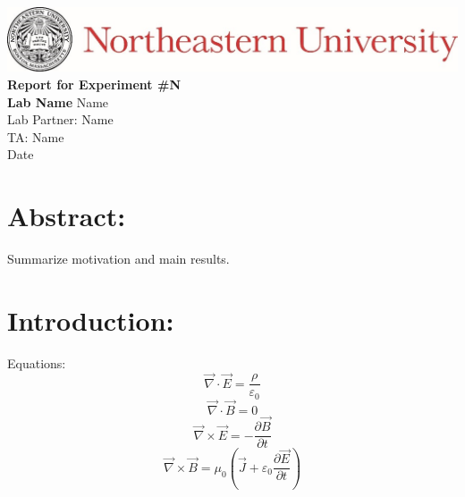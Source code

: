 \documentclass[12pt,a4paper]{article}
\begin{document}
	\begin{center}
		\includegraphics{Header}
		\vfill		
		\textbf{\Large{Report for Experiment \#N\\
		Lab Name}}
		\vfill
		Name\\
		Lab Partner: Name\\
		TA: Name\\
		Date
		\vfill
	\end{center}
	
	\section*{Abstract:}
		Summarize motivation and main results.
	
	\newpage
	
	\section*{Introduction:}
		Equations:
		\[ \vec{\nabla} \cdot \vec{E} = \frac{\rho}{\varepsilon_0} \tag{1} \]
		\[ \vec{\nabla} \cdot \vec{B} = 0 \tag{2} \]
		\[ \vec{\nabla} \times \vec{E} = - \frac{\partial \vec{B}}{\partial t} \tag{3} \]
		\[ \vec{\nabla} \times \vec{B} = \mu_0 \left( \vec{J} + \varepsilon_0 \frac{\partial \vec{E}}{\partial t} \right) \tag{4} \]
	
\end{document}
